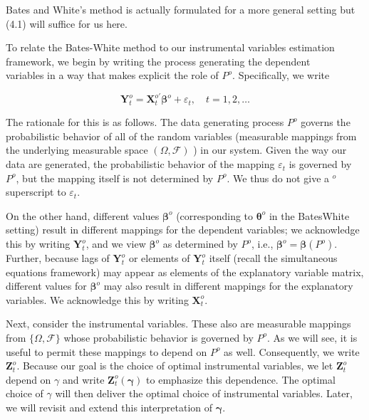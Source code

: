 \documentclass[10pt]{article}
\begin{document}
Bates and White's method is actually formulated for a more general setting but (4.1) will suffice for us here.

To relate the Bates-White method to our instrumental variables estimation framework, we begin by writing the process generating the dependent\\
variables in a way that makes explicit the role of $P^{o}$. Specifically, we write

$$
\mathbf{Y}_{t}^{o}=\mathbf{X}_{t}^{o \prime} \boldsymbol{\beta}^{o}+\varepsilon_{t}, \quad t=1,2, \ldots
$$

The rationale for this is as follows. The data generating process $P^{o}$ governs the probabilistic behavior of all of the random variables (measurable mappings from the underlying measurable space $(\Omega, \mathcal{F})$ ) in our system. Given the way our data are generated, the probabilistic behavior of the mapping $\varepsilon_{t}$ is governed by $P^{o}$, but the mapping itself is not determined by $P^{o}$. We thus do not give a ${ }^{o}$ superscript to $\varepsilon_{t}$.

On the other hand, different values $\boldsymbol{\beta}^{o}$ (corresponding to $\boldsymbol{\theta}^{o}$ in the BatesWhite setting) result in different mappings for the dependent variables; we acknowledge this by writing $\mathbf{Y}_{t}^{o}$, and we view $\boldsymbol{\beta}^{o}$ as determined by $P^{o}$, i.e., $\boldsymbol{\beta}^{o}=\boldsymbol{\beta}\left(P^{o}\right)$. Further, because lags of $\mathbf{Y}_{t}^{o}$ or elements of $\mathbf{Y}_{t}^{o}$ itself (recall the simultaneous equations framework) may appear as elements of the explanatory variable matrix, different values for $\boldsymbol{\beta}^{o}$ may also result in different mappings for the explanatory variables. We acknowledge this by writing $\mathbf{X}_{t}^{o}$.

Next, consider the instrumental variables. These also are measurable mappings from $\{\Omega, \mathcal{F}\}$ whose probabilistic behavior is governed by $P^{o}$. As we will see, it is useful to permit these mappings to depend on $P^{o}$ as well. Consequently, we write $\mathbf{Z}_{t}^{o}$. Because our goal is the choice of optimal instrumental variables, we let $\mathbf{Z}_{t}^{o}$ depend on $\gamma$ and write $\mathbf{Z}_{t}^{o}(\boldsymbol{\gamma})$ to emphasize this dependence. The optimal choice of $\gamma$ will then deliver the optimal choice of instrumental variables. Later, we will revisit and extend this interpretation of $\boldsymbol{\gamma}$.
\end{document}
